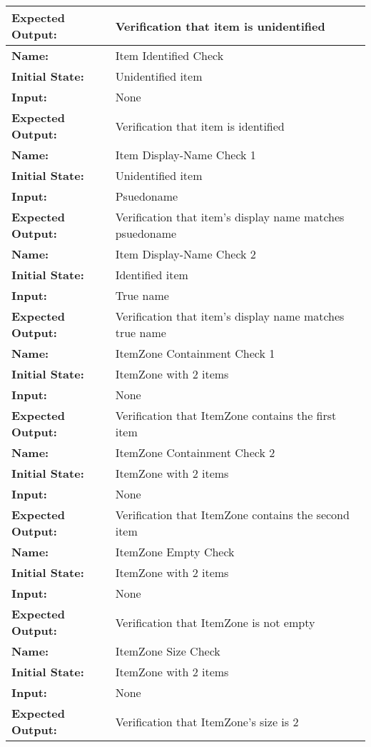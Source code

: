 \documentclass[12pt, titlepage]{article}
\begin{document}
\begin{center}
\begin{longtable}{ l | l }
\textbf{Expected Output:} & Verification that item is unidentified\\
\hline
\textbf{Name:} & Item Identified Check\\
\textbf{Initial State:} & Unidentified item\\
\textbf{Input:} & None\\
\textbf{Expected Output:} & Verification that item is identified\\
\hline
\textbf{Name:} & Item Display-Name Check 1\\
\textbf{Initial State:} & Unidentified item\\
\textbf{Input:} & Psuedoname\\
\textbf{Expected Output:} & Verification that item's display name matches psuedoname\\
\hline
\textbf{Name:} & Item Display-Name Check 2\\
\textbf{Initial State:} & Identified item\\
\textbf{Input:} & True name\\
\textbf{Expected Output:} & Verification that item's display name matches true name\\
\hline
\textbf{Name:} & ItemZone Containment Check 1\\
\textbf{Initial State:} & ItemZone with 2 items\\
\textbf{Input:} & None\\
\textbf{Expected Output:} & Verification that ItemZone contains the first item\\
\hline
\textbf{Name:} & ItemZone Containment Check 2\\
\textbf{Initial State:} & ItemZone with 2 items\\
\textbf{Input:} & None\\
\textbf{Expected Output:} & Verification that ItemZone contains the second item\\
\hline
\textbf{Name:} & ItemZone Empty Check\\
\textbf{Initial State:} & ItemZone with 2 items\\
\textbf{Input:} & None\\
\textbf{Expected Output:} & Verification that ItemZone is not empty\\
\hline
\textbf{Name:} & ItemZone Size Check\\
\textbf{Initial State:} & ItemZone with 2 items\\
\textbf{Input:} & None\\
\textbf{Expected Output:} & Verification that ItemZone's size is 2\\

\end{longtable}
\end{center}
\end{document}

